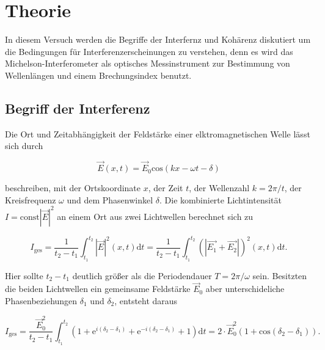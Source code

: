 \section{Theorie}

    \noindent In diesem Versuch werden die Begriffe der Interfernz und Kohärenz diskutiert um die Bedingungen für 
    Interferenzerscheinungen zu verstehen, denn es wird das Michelson-Interferometer als optisches Messinstrument zur Bestimmung von 
    Wellenlängen und einem Brechungsindex benutzt.

    \subsection{Begriff der Interferenz}

        \noindent Die Ort und Zeitabhängigkeit der Feldstärke einer elktromagnetischen Welle lässt sich durch 

        \begin{equation}
            \vec{E}(x,t) = \vec{E}_0 \text{cos}(kx - \omega t - \delta)
        \end{equation}

        \noindent beschreiben, mit der Ortskoordinate $x$, der Zeit $t$, der Wellenzahl $k = 2\pi/t$, der Kreisfrequenz $\omega$ und dem 
        Phasenwinkel $\delta$. Die kombinierte Lichtintensität $I = \text{const} |\vec{E}|^2$ an einem Ort aus zwei Lichtwellen berechnet sich 
        zu 

        \begin{equation}
            I_{\text{ges}} = \frac{1}{t_2 -t_1} \int_{t_1}^{t_2} |\vec{E}|^2(x,t) \text{d} t = 
            \frac{1}{t_2 -t_1} \int_{t_1}^{t_2} \left( |\vec{E_1} + \vec{E_2}| \right) ^2(x,t) \text{d} t  .
        \end{equation}

        \noindent Hier sollte $t_2 - t_1$ deutlich größer als die Periodendauer $T=2\pi/\omega$ sein.
        Besitzten die beiden Lichtwellen ein gemeinsame Feldstärke $\vec{E}_0$ aber unterschideliche Phasenbeziehungen $\delta_1$ und $\delta_2$,
        entsteht daraus 

        \begin{equation}
            I_{\text{ges}} = \frac{\vec{E}_0^2}{t_2 - t_1} \int_{t_1}^{t_2} \left( 1 + \text{e}^{i(\delta_2 -\delta_1)} +\text{e}^{-i(\delta_2 -\delta_1)}
            +1 \right) \text{d} t = 2 \cdot \vec{E}_0^2 ( 1+ \text{cos}(\delta_2 - \delta_1)) .
        \end{equation}

